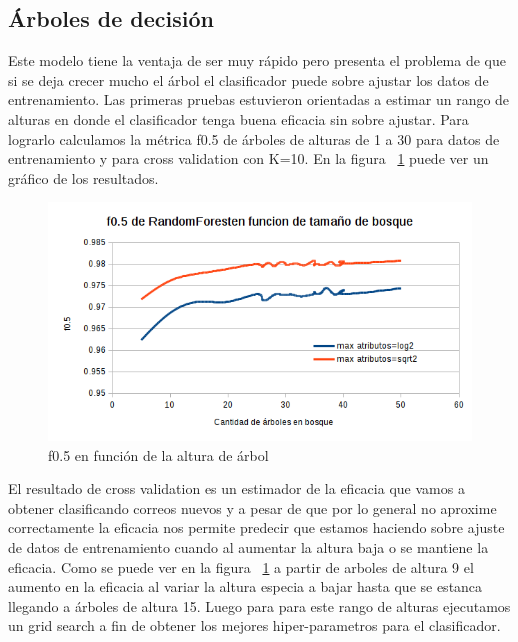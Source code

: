 \subsection{Árboles de decisión}

Este modelo tiene la ventaja de ser muy rápido pero presenta el problema de que si se deja crecer mucho el árbol el clasificador puede sobre ajustar los datos de entrenamiento. Las primeras pruebas estuvieron orientadas a estimar un rango de alturas en donde el clasificador tenga buena eficacia sin sobre ajustar. Para lograrlo calculamos la métrica  f0.5 de árboles de alturas de 1 a 30 para datos de entrenamiento y para cross validation con K=10. En la figura ~\ref{fig:arboles_f05_en_funcion_altura} puede ver un gráfico de los resultados.

\begin{figure}[H]
    \centering
        \includegraphics[width=\textwidth]{plots/forest_f05_en_funcion_de_cantidad_de_arboles.png}
        \caption{f0.5 en función de la altura de árbol}
        \label{fig:arboles_f05_en_funcion_altura}
\end{figure}

	El resultado de cross validation es un estimador de la eficacia que vamos a obtener clasificando correos nuevos y a pesar de que por lo general no aproxime correctamente la eficacia nos permite predecir que estamos haciendo sobre ajuste de datos de entrenamiento cuando al aumentar la altura baja o se mantiene la eficacia. Como se puede ver en la figura ~\ref{fig:arboles_f05_en_funcion_altura} a partir de arboles de altura 9 el aumento en la eficacia al variar la altura especia a bajar hasta que se estanca llegando a árboles de altura 15. 
    Luego para para este rango de alturas ejecutamos un grid search a fin de obtener los mejores hiper-parametros para el clasificador. 

